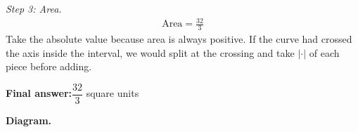 \documentclass[11pt]{article}
\begin{document}
\textit{Step 3: Area.}
\[\begin{gathered}
\text{Area} = \frac{32}{3}
\end{gathered}\]
Take the absolute value because area is always positive. If the curve had crossed the axis inside the interval, we would split at the crossing and take \(|\cdot|\) of each piece before adding.

\begin{answerbox}
\textbf{Final answer:}\quad \(\displaystyle  \dfrac{32}{3} \) square units
\end{answerbox}
\textbf{Diagram.}

\begin{center}
\end{center}
\end{document}
